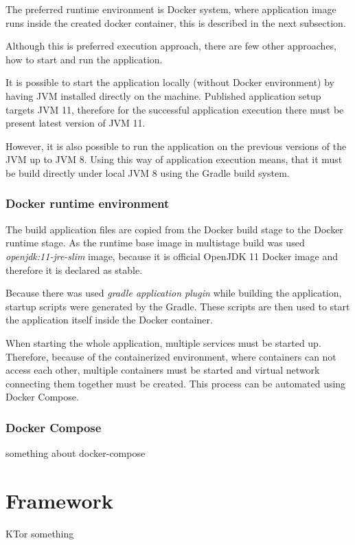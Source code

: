 The preferred runtime environment is Docker system, 
where application image runs inside the created docker container,
this is described in the next subsection.

Although this is preferred execution approach,
there are few other approaches,
how to start and run the application.

It is possible to start the application locally (without Docker environment) by having JVM installed directly on the machine.
Published application setup targets JVM 11, 
therefore for the successful application execution there must be present latest version of JVM 11.

However,
it is also possible to run the application on the previous versions of the JVM up to JVM 8.
Using this way of application execution means,
that it must be build directly under local JVM 8 using the Gradle build system.

\subsubsection{Docker runtime environment}\label{subsubsec:docker-runtime-env}
The build application files are copied from the Docker build stage to the Docker runtime stage.
As the runtime base image in multistage build was used \textit{openjdk:11-jre-slim} image,
because it is official OpenJDK 11 Docker image and therefore it is declared as stable.

Because there was used \textit{gradle application plugin} while building the application, 
startup scripts were generated by the Gradle.
These scripts are then used to start the application itself inside the Docker container.

When starting the whole application, 
multiple services must be started up.
Therefore, because of the containerized environment,
where containers can not access each other,
multiple containers must be started and virtual network connecting them together must be created.
This process can be automated using Docker Compose.

\subsubsection{Docker Compose}
something about docker-compose

\section{Framework}
KTor something

